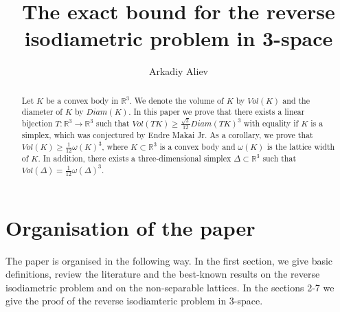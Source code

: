 \documentclass[12pt]{article}
\begin{document}
\title{The exact bound for the reverse isodiametric problem in 3-space
}
\author{Arkadiy Aliev}
\date{}
\maketitle

    \begin{abstract}
        Let $K$ be a convex body in $\mathbb{R}^{3}$. We denote the volume of $K$ by $Vol(K)$ and the diameter of $K$ by $Diam(K).$  In this paper we prove that there exists a linear bijection $T:\mathbb{R}^{3}\to \mathbb{R}^{3}$ such that $Vol(TK)\geq \frac{\sqrt{2}}{12}Diam(TK)^3$ with equality if $K$ is a simplex, which was conjectured by Endre Makai Jr.      
        As a corollary, we prove that  $Vol(K)\geq \frac{1}{12}\omega(K)^3$, where $K\subset \mathbb{R}^{3}$ is a convex body and  $\omega(K)$ is the lattice width of $K$. In addition, there exists a  three-dimensional simplex $\Delta\subset \mathbb{R}^3$ such that $Vol(\Delta) = \frac{1}{12}\omega(\Delta)^3.$
    \end{abstract}



\section*{Organisation of the paper}

        The paper is organised in the following way. In the first section, we give basic definitions, review  the literature and the best-known results on the reverse isodiametric problem and on the non-separable lattices. In the sections 2-7 we give the proof of the reverse isodiamteric problem in 3-space.   
    \tableofcontents
\end{document}
